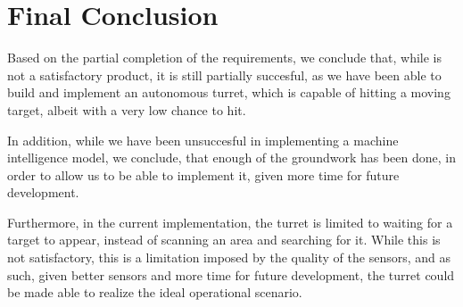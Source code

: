 \section{Final Conclusion}
Based on the partial completion of the requirements, we conclude that, while
\name is not a satisfactory product, it is still partially succesful, as we have
been able to build and implement an autonomous turret, which is capable of
hitting a moving target, albeit with a very low chance to hit.\nl

In addition, while we have been unsuccesful in implementing a machine
intelligence model, we conclude, that enough of the groundwork has been done, in
order to allow us to be able to implement it, given more time for future
development.\nl

Furthermore, in the current implementation, the turret is limited to waiting for
a target to appear, instead of scanning an area and searching for it. While this
is not satisfactory, this is a limitation imposed by the quality of the sensors,
and as such, given better sensors and more time for future development, the
turret could be made able to realize the ideal operational scenario.
